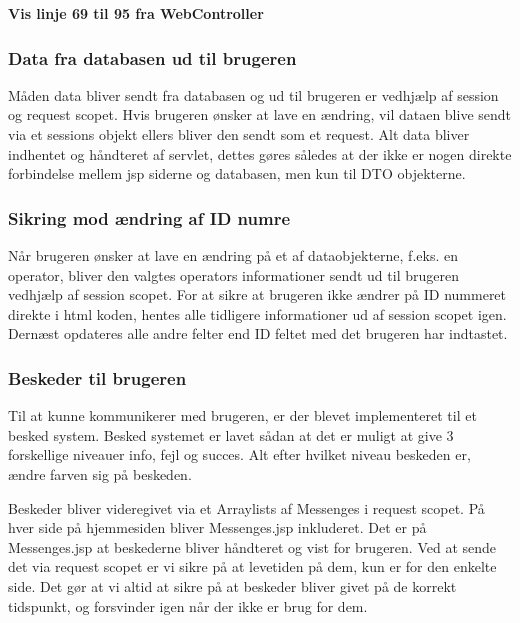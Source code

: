 \documentclass[a4paper]{article}
\begin{document}
\textbf{Vis linje 69 til 95 fra WebController}

\subsubsection{Data fra databasen ud til brugeren} %

Måden data bliver sendt fra databasen og ud til brugeren er vedhjælp af session og request scopet. Hvis brugeren ønsker at lave en ændring, vil dataen blive sendt via et sessions objekt ellers bliver den sendt som et request.  Alt data bliver indhentet og håndteret af servlet, dettes gøres således at der ikke er nogen direkte forbindelse mellem jsp siderne og databasen, men kun til DTO objekterne.   


\subsubsection{Sikring mod ændring af ID numre} %

Når brugeren ønsker at lave en ændring på et af dataobjekterne, f.eks. en operator, bliver den valgtes operators informationer sendt ud til brugeren vedhjælp af session scopet. For at sikre at brugeren ikke ændrer på ID nummeret direkte i html koden, hentes alle tidligere informationer ud af session scopet igen.  Dernæst opdateres alle andre felter end ID feltet med det brugeren har indtastet.


\subsubsection{Beskeder til brugeren} %

Til at kunne kommunikerer med brugeren, er der blevet implementeret til et besked system. Besked systemet er lavet sådan at det er muligt at give 3 forskellige niveauer info, fejl og succes. Alt efter hvilket niveau beskeden er, ændre farven sig på beskeden. 

Beskeder bliver videregivet via et Arraylists af Messenges i request scopet. På hver side på hjemmesiden bliver Messenges.jsp inkluderet. Det er på Messenges.jsp at beskederne bliver håndteret og vist for brugeren. Ved at sende det via request scopet er vi sikre på at levetiden på dem, kun er for den enkelte side. Det gør at vi altid at sikre på at beskeder bliver givet på de korrekt tidspunkt, og forsvinder igen når der ikke er brug for dem.
\end{document}
